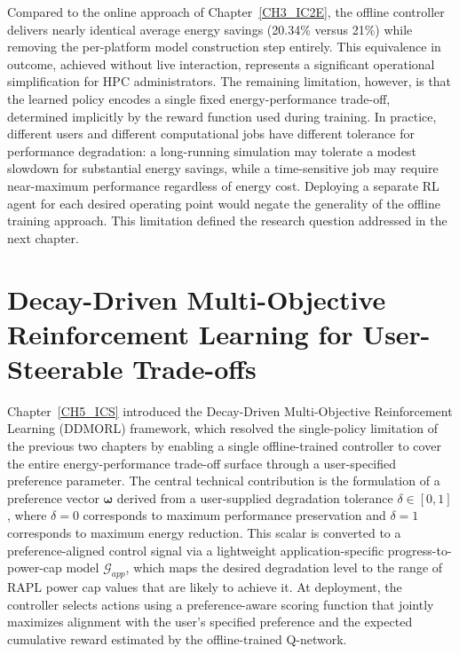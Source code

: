 Compared to the online approach of Chapter~\ref{CH3_IC2E}, the offline controller
delivers nearly identical average energy savings (20.34\% versus 21\%) while removing
the per-platform model construction step entirely.
This equivalence in outcome, achieved without live interaction, represents a significant
operational simplification for HPC administrators.
The remaining limitation, however, is that the learned policy encodes a single fixed
energy-performance trade-off, determined implicitly by the reward function used during
training.
In practice, different users and different computational jobs have different tolerance
for performance degradation: a long-running simulation may tolerate a modest slowdown
for substantial energy savings, while a time-sensitive job may require near-maximum
performance regardless of energy cost.
Deploying a separate RL agent for each desired operating point would negate the
generality of the offline training approach.
This limitation defined the research question addressed in the next chapter.

\section{Decay-Driven Multi-Objective Reinforcement Learning for User-Steerable Trade-offs}

Chapter~\ref{CH5_ICS} introduced the Decay-Driven Multi-Objective Reinforcement
Learning (DDMORL) framework, which resolved the single-policy limitation of the
previous two chapters by enabling a single offline-trained controller to cover the
entire energy-performance trade-off surface through a user-specified preference
parameter.
The central technical contribution is the formulation of a preference vector
$\boldsymbol{\omega}$ derived from a user-supplied degradation tolerance
$\delta \in [0,1]$, where $\delta = 0$ corresponds to maximum performance preservation
and $\delta = 1$ corresponds to maximum energy reduction.
This scalar is converted to a preference-aligned control signal via a lightweight
application-specific progress-to-power-cap model $\mathcal{G}_{app}$, which maps the
desired degradation level to the range of RAPL power cap values that are likely to
achieve it.
At deployment, the controller selects actions using a preference-aware scoring function
that jointly maximizes alignment with the user's specified preference and the expected
cumulative reward estimated by the offline-trained Q-network.

